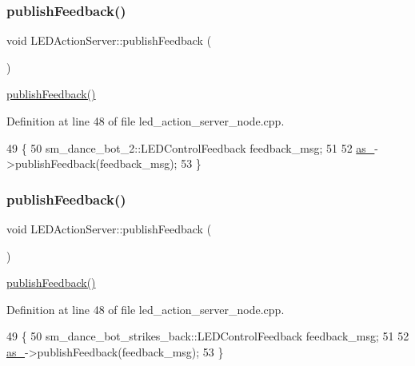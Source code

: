 \subsubsection{\texorpdfstring{publish\+Feedback()}{publishFeedback()}\hspace{0.1cm}{\footnotesize\ttfamily [1/3]}}
{\footnotesize\ttfamily void L\+E\+D\+Action\+Server\+::publish\+Feedback (\begin{DoxyParamCaption}{ }\end{DoxyParamCaption})\hspace{0.3cm}{\ttfamily [inline]}}

\hyperlink{classLEDActionServer_a25c93d4e7ecdacbb4f5b090d7789aa36}{publish\+Feedback()} 

Definition at line 48 of file led\+\_\+action\+\_\+server\+\_\+node.\+cpp.


\begin{DoxyCode}
49 \{
50     sm\_dance\_bot\_2::LEDControlFeedback feedback\_msg;
51     
52     \hyperlink{classLEDActionServer_a61d21c77642081acf017d4ebd65b2de0}{as\_}->publishFeedback(feedback\_msg);
53 \}
\end{DoxyCode}
\mbox{\label{classLEDActionServer_a25c93d4e7ecdacbb4f5b090d7789aa36}} 
\subsubsection{\texorpdfstring{publish\+Feedback()}{publishFeedback()}\hspace{0.1cm}{\footnotesize\ttfamily [2/3]}}
{\footnotesize\ttfamily void L\+E\+D\+Action\+Server\+::publish\+Feedback (\begin{DoxyParamCaption}{ }\end{DoxyParamCaption})\hspace{0.3cm}{\ttfamily [inline]}}

\hyperlink{classLEDActionServer_a25c93d4e7ecdacbb4f5b090d7789aa36}{publish\+Feedback()} 

Definition at line 48 of file led\+\_\+action\+\_\+server\+\_\+node.\+cpp.


\begin{DoxyCode}
49 \{
50     sm\_dance\_bot\_strikes\_back::LEDControlFeedback feedback\_msg;
51     
52     \hyperlink{classLEDActionServer_a61d21c77642081acf017d4ebd65b2de0}{as\_}->publishFeedback(feedback\_msg);
53 \}
\end{DoxyCode}
\mbox{\label{classLEDActionServer_a25c93d4e7ecdacbb4f5b090d7789aa36}} 
